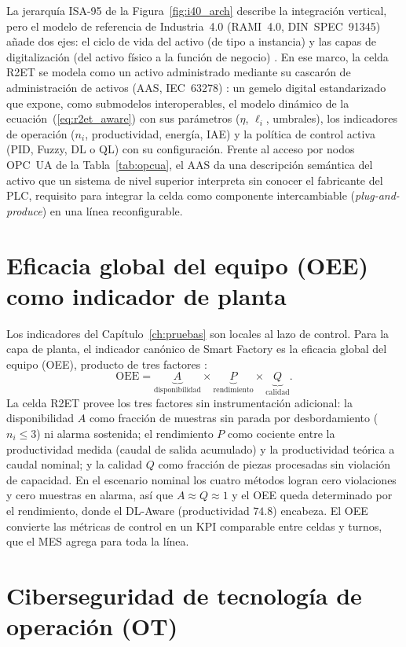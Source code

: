 La jerarquía ISA-95 de la Figura~\ref{fig:i40_arch} describe la integración vertical, pero el modelo de referencia de Industria~4.0 (RAMI~4.0, DIN~SPEC~91345) añade dos ejes: el ciclo de vida del activo (de tipo a instancia) y las capas de digitalización (del activo físico a la función de negocio) \cite{din2016rami40}. En ese marco, la celda R2ET se modela como un activo administrado mediante su cascarón de administración de activos (AAS, IEC~63278) \cite{iec63278aas}: un gemelo digital estandarizado que expone, como submodelos interoperables, el modelo dinámico de la ecuación~(\ref{eq:r2et_aware}) con sus parámetros ($\eta$, $\ell_i$, umbrales), los indicadores de operación ($n_i$, productividad, energía, IAE) y la política de control activa (PID, Fuzzy, DL o QL) con su configuración. Frente al acceso por nodos OPC~UA de la Tabla~\ref{tab:opcua}, el AAS da una descripción semántica del activo que un sistema de nivel superior interpreta sin conocer el fabricante del PLC, requisito para integrar la celda como componente intercambiable (\emph{plug-and-produce}) en una línea reconfigurable.

\section{Eficacia global del equipo (OEE) como indicador de planta}

Los indicadores del Capítulo~\ref{ch:pruebas} son locales al lazo de control. Para la capa de planta, el indicador canónico de Smart Factory es la eficacia global del equipo (OEE), producto de tres factores \cite{nakajima1988tpm}:
\[
\text{OEE} = \underbrace{A}_{\text{disponibilidad}} \times \underbrace{P}_{\text{rendimiento}} \times \underbrace{Q}_{\text{calidad}}.
\]
La celda R2ET provee los tres factores sin instrumentación adicional: la disponibilidad $A$ como fracción de muestras sin parada por desbordamiento ($n_i\le 3$) ni alarma sostenida; el rendimiento $P$ como cociente entre la productividad medida (caudal de salida acumulado) y la productividad teórica a caudal nominal; y la calidad $Q$ como fracción de piezas procesadas sin violación de capacidad. En el escenario nominal los cuatro métodos logran cero violaciones y cero muestras en alarma, así que $A\approx Q\approx 1$ y el OEE queda determinado por el rendimiento, donde el DL-Aware (productividad $74.8$) encabeza. El OEE convierte las métricas de control en un KPI comparable entre celdas y turnos, que el MES agrega para toda la línea.

\section{Ciberseguridad de tecnología de operación (OT)}

